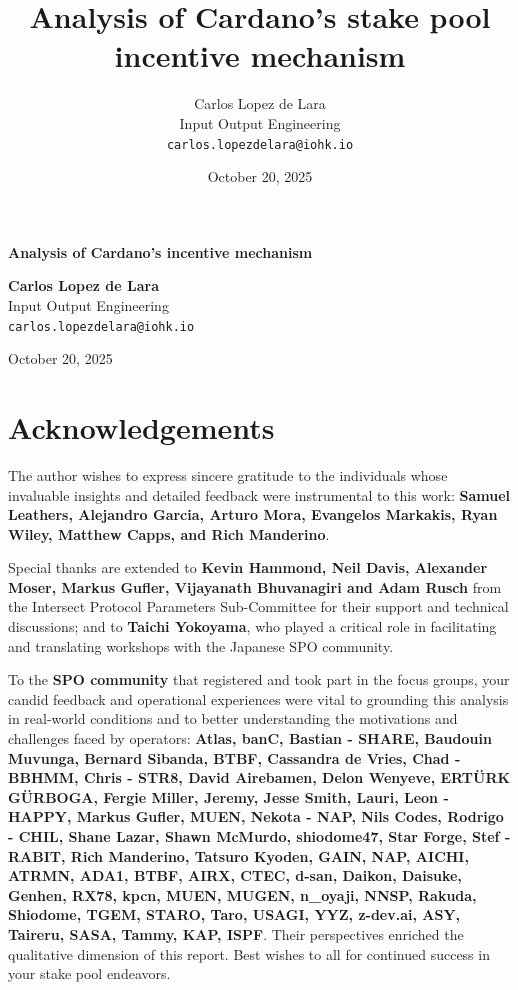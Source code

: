 \documentclass[11pt, letterpaper]{article}
\title{Analysis of Cardano's stake pool incentive mechanism}
\author{
    Carlos Lopez de Lara \\
    Input Output Engineering \\
    \texttt{carlos.lopezdelara@iohk.io}
}
\date{October 20, 2025}
\begin{document}
\begin{titlepage}
    \centering %
    
    \vfill %
    
    {\Huge \textbf{Analysis of Cardano's incentive mechanism}}
    
    \vfill 
    
    {
        \Large \textbf{Carlos Lopez de Lara} \\
        \vspace{1em} 
        \large Input Output Engineering \\
        \large \texttt{carlos.lopezdelara@iohk.io}
    }
    
    \vfill
    
    {\large October 20, 2025}
    
    \vfill 
\end{titlepage}

\thispagestyle{empty} 

\tableofcontents
\newpage
\pagestyle{fancy} 

\newpage

\section*{Acknowledgements}

The author wishes to express sincere gratitude to the individuals whose 
invaluable insights and detailed feedback were instrumental to this work: 
\textbf{Samuel Leathers, Alejandro Garcia, Arturo Mora, Evangelos Markakis, Ryan Wiley, 
Matthew Capps, and Rich Manderino}.

Special thanks are extended to \textbf{Kevin Hammond, Neil Davis, Alexander Moser, Markus Gufler, 
Vijayanath Bhuvanagiri and Adam Rusch} from the Intersect Protocol Parameters Sub-Committee for 
their support and technical discussions; and to \textbf{Taichi Yokoyama}, who played a critical role in
facilitating and translating workshops with the Japanese SPO community.

To the \textbf{SPO community} that registered and took part in the focus groups, your candid 
feedback and operational experiences were vital to grounding this analysis in real-world conditions
and to better understanding the motivations and challenges faced by operators: \textbf{Atlas, banC, Bastian - SHARE, 
Baudouin Muvunga, Bernard Sibanda, BTBF, Cassandra de Vries, Chad - BBHMM, Chris - STR8, 
David Airebamen, Delon Wenyeve, ERT\"URK G\"URBOGA, Fergie Miller, Jeremy, Jesse Smith, Lauri, Leon - HAPPY, 
Markus Gufler, MUEN, Nekota - NAP, Nils Codes, Rodrigo - CHIL, Shane Lazar, Shawn McMurdo, 
shiodome47, Star Forge, Stef - RABIT, Rich Manderino, Tatsuro Kyoden, GAIN, NAP, AICHI, ATRMN, ADA1, BTBF, AIRX,
CTEC, d-san, Daikon, Daisuke, Genhen, RX78, kpcn, MUEN, MUGEN, n\_oyaji, NNSP, Rakuda, Shiodome, TGEM, STARO, Taro,
USAGI, YYZ, z-dev.ai, ASY, Taireru, SASA, Tammy, KAP, ISPF}. Their perspectives enriched the qualitative dimension of this
report. Best wishes to all for continued success in your stake pool endeavors.
\end{document}
